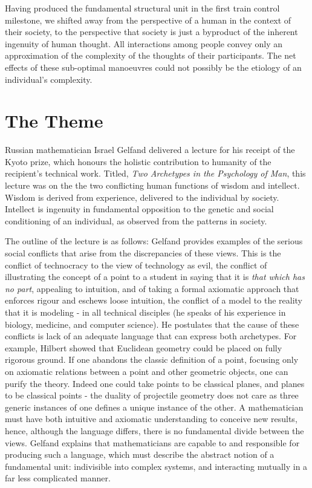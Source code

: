 \documentclass{amsart} \usepackage{amsmath} \usepackage{upgreek}
\begin{document}
Having produced the fundamental structural unit in the first train control milestone, we shifted away from the perspective of a human in the context of their society, to the perspective that society is just a byproduct of the inherent ingenuity of human thought. All interactions among people convey only an approximation of the complexity of the thoughts of their participants. The net effects of these sub-optimal manoeuvres could not possibly be the etiology of an individual's complexity.

\section*{The Theme}

Russian mathematician Israel Gelfand delivered a lecture for his receipt of the Kyoto prize, which honours the holistic contribution to humanity of the recipient's technical work. Titled, \textit{Two Archetypes in the Psychology of Man}, this lecture was on the the two conflicting human functions of wisdom and intellect. Wisdom is derived from experience, delivered to the individual by society. Intellect is ingenuity in fundamental opposition to the genetic and social conditioning of an individual, as observed from the patterns in society.

The outline of the lecture is as follows: Gelfand provides examples of the serious social conflicts that arise from the discrepancies of these views. This is the conflict of technocracy to the view of technology as evil, the conflict of illustrating the concept of a point to a student in saying that it is \textit{that which has no part}, appealing to intuition, and of taking a formal axiomatic approach that enforces rigour and eschews loose intuition, the conflict of a model to the reality that it is modeling - in all technical disciples (he speaks of his experience in biology, medicine, and computer science). He postulates that the cause of these conflicts is lack of an adequate language that can express both archetypes. For example, Hilbert showed that Euclidean geometry could be placed on fully rigorous ground. If one abandons the classic definition of a point, focusing only on axiomatic relations between a point and other geometric objects, one can purify the theory. Indeed one could take points to be classical planes, and planes to be classical points - the duality of projectile geometry does not care as three generic instances of one defines a unique instance of the other. A mathematician must have both intuitive and axiomatic understanding to conceive new results, hence, although the language differs, there is no fundamental divide between the views. Gelfand explains that mathematicians are capable to and responsible for producing such a language, which must describe the abstract notion of a fundamental unit: indivisible into complex systems, and interacting mutually in a far less complicated manner.
\end{document}
